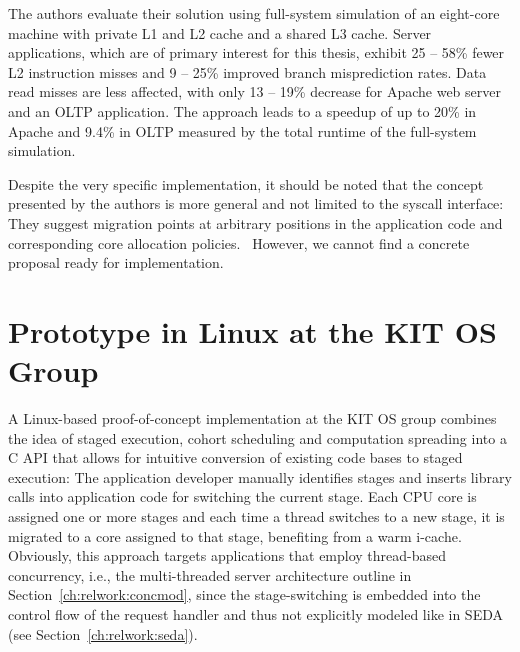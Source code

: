 \documentclass[12pt,a4paper]{book}
\begin{document}
The authors evaluate their solution using full-system simulation of an eight-core machine with private L1 and L2 cache and a shared L3 cache.
Server applications, which are of primary interest for this thesis, exhibit 25 -- 58\% fewer L2 instruction misses and 9 -- 25\% improved branch misprediction rates.
Data read misses are less affected, with only 13 -- 19\% decrease for Apache web server and an OLTP application.
The approach leads to a speedup of up to 20\% in Apache and 9.4\% in OLTP measured by the total runtime of the full-system simulation.~\cite{compspr}

Despite the very specific implementation, it should be noted that the concept presented by the authors is more general and not limited to the syscall interface:
They suggest migration points at arbitrary positions in the application code and corresponding core allocation policies.~\cite{compspr}
However, we cannot find a concrete proposal ready for implementation.


\section{Prototype in Linux at the KIT OS Group}\label{ch:relwork:kitpoc}
\NewDocumentCommand{\klt}{}{\textsc{klt}\xspace}
\NewDocumentCommand{\klts}{}{\textsc{klt}s\xspace}
\NewDocumentCommand{\ult}{}{\textsc{ult}\xspace}
\NewDocumentCommand{\ults}{}{\textsc{ult}s\xspace}
A Linux-based proof-of-concept implementation at the KIT OS group combines the idea of staged execution, cohort scheduling and computation spreading into a C API that allows for intuitive conversion of existing code bases to staged execution:
The application developer manually identifies stages and inserts library calls into application code for switching the current stage.
Each CPU core is assigned one or more stages and each time a thread switches to a new stage, it is migrated to a core assigned to that stage, benefiting from a warm i-cache.
Obviously, this approach targets applications that employ thread-based concurrency, i.e., the multi-threaded server architecture outline in Section~\ref{ch:relwork:concmod}, since the stage-switching is embedded into the control flow of the request handler and thus not explicitly modeled like in SEDA (see Section~\ref{ch:relwork:seda}).
\end{document}
